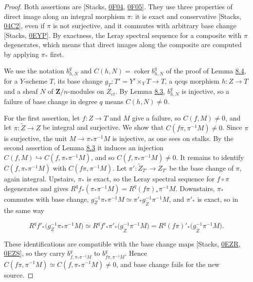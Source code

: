 \documentclass[11pt]{article}
\begin{document}
\begin{proof}[{Proof}]\label{bp24}%
Both assertions are [Stacks, \href{https://stacks.math.columbia.edu/tag/0F04}{0F04}, \href{https://stacks.math.columbia.edu/tag/0F05}{0F05}]. They use three properties of direct image along an integral morphism \(\pi\): it is exact and conservative [Stacks, \href{https://stacks.math.columbia.edu/tag/04C2}{04C2}], even if \(\pi\) is not surjective, and it commutes with arbitrary base change [Stacks, \href{https://stacks.math.columbia.edu/tag/0EYP}{0EYP}]. By exactness, the Leray spectral sequence for a composite with \(\pi\) degenerates, which means that direct images along the composite are computed by applying \(\pi_*\) first.

We use the notation \(b^q_{h,N}\) and \(C(h,N)=\operatorname{coker}b^q_{h,N}\) of the proof of Lemma \hyperref[bp20]{8.4}, for a \(Y\)-scheme \(T\), its base change \(g_T:T'=Y'\times_YT\to T\), a qcqs morphism \(h:Z\to T\) and a sheaf \(N\) of \(\mathbf Z/n\)-modules on \(Z_{\acute{e}t}\). By Lemma \hyperref[bp17]{8.3}, \(b^q_{h,N}\) is injective, so a failure of base change in degree \(q\) means \(C(h,N)\neq0\).

For the first assertion, let \(f:Z\to T\) and \(M\) give a failure, so \(C(f,M)\neq0\), and let \(\pi:\widetilde Z\to Z\) be integral and surjective. We show that \(C(f\pi,\pi^{-1}M)\neq0\). Since \(\pi\) is surjective, the unit \(M\to\pi_*\pi^{-1}M\) is injective, as one sees on stalks. By the second assertion of Lemma \hyperref[bp17]{8.3} it induces an injection \(C(f,M)\hookrightarrow C(f,\pi_*\pi^{-1}M)\), and so \(C(f,\pi_*\pi^{-1}M)\neq0\). It remains to identify \(C(f,\pi_*\pi^{-1}M)\) with \(C(f\pi,\pi^{-1}M)\). Let \(\pi':\widetilde Z_{T'}\to Z_{T'}\) be the base change of \(\pi\), again integral. Upstairs, \(\pi_*\) is exact, so the Leray spectral sequence for \(f\circ\pi\) degenerates and gives \(R^qf_*(\pi_*\pi^{-1}M)=R^q(f\pi)_*\pi^{-1}M\). Downstairs, \(\pi_*\) commutes with base change, \(g_Z^{-1}\pi_*\pi^{-1}M\simeq\pi'_*g_{\widetilde Z}^{-1}\pi^{-1}M\), and \(\pi'_*\) is exact, so in the same way

\[
R^qf'_*\bigl(g_Z^{-1}\pi_*\pi^{-1}M\bigr)
\simeq R^qf'_*\pi'_*\bigl(g_{\widetilde Z}^{-1}\pi^{-1}M\bigr)
=R^q(f\pi)'_*\bigl(g_{\widetilde Z}^{-1}\pi^{-1}M\bigr).
\]

These identifications are compatible with the base change maps [Stacks, \href{https://stacks.math.columbia.edu/tag/0EZR}{0EZR}, \href{https://stacks.math.columbia.edu/tag/0EZS}{0EZS}], so they carry \(b^q_{f,\pi_*\pi^{-1}M}\) to \(b^q_{f\pi,\pi^{-1}M}\). Hence \(C(f\pi,\pi^{-1}M)\simeq C(f,\pi_*\pi^{-1}M)\neq0\), and base change fails for the new source.


\end{proof}
\end{document}
